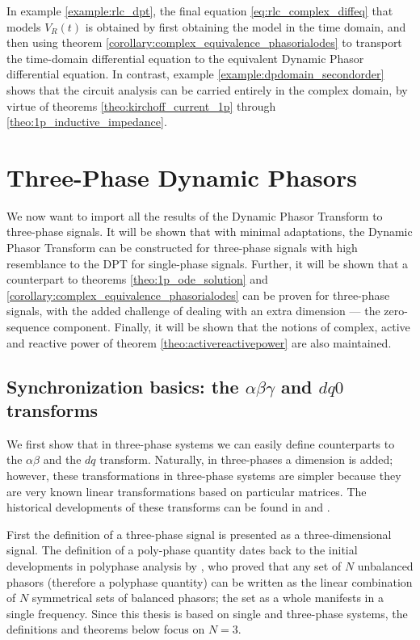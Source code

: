 	In example \ref{example:rlc_dpt}, the final equation \eqref{eq:rlc_complex_diffeq} that models $V_R(t)$ is obtained by first obtaining the model in the time domain, and then using theorem \ref{corollary:complex_equivalence_phasorialodes} to transport the time-domain differential equation to the equivalent Dynamic Phasor differential equation. In contrast, example \ref{example:dpdomain_secondorder} shows that the circuit analysis can be carried entirely in the complex domain, by virtue of theorems \ref{theo:kirchoff_current_1p} through \ref{theo:1p_inductive_impedance}.

\section{Three-Phase Dynamic Phasors} %

	We now want to import all the results of the Dynamic Phasor Transform to three-phase signals. It will be shown that with minimal adaptations, the Dynamic Phasor Transform can be constructed for three-phase signals with high resemblance to the DPT for single-phase signals. Further, it will be shown that a counterpart to theorems \ref{theo:1p_ode_solution} and \ref{corollary:complex_equivalence_phasorialodes} can be proven for three-phase signals, with the added challenge of dealing with an extra dimension — the zero-sequence component. Finally, it will be shown that the notions of complex, active and reactive power of theorem \ref{theo:activereactivepower} are also maintained.

\subsection{Synchronization basics: the $\alpha\beta\gamma$ and $dq0$ transforms} %

	We first show that in three-phase systems we can easily define counterparts to the $\alpha\beta$ and the $dq$ transform. Naturally, in three-phases a dimension is added; however, these transformations in three-phase systems are simpler because they are very known linear transformations based on particular matrices. The historical developments of these transforms can be found in  \cite{orourkeGeometricInterpretationReference2019,Park1929,Krause1965} and \cite{clarke1938problems}.

	First the definition of a three-phase signal is presented as a three-dimensional signal. The definition of a poly-phase quantity dates back to the initial developments in polyphase analysis by \cite{Fortescue1918}, who proved that any set of $N$ unbalanced phasors (therefore a polyphase quantity) can be written as the linear combination of $N$ symmetrical sets of balanced phasors; the set as a whole manifests in a single frequency. Since this thesis is based on single and three-phase systems, the definitions and theorems below focus on $N=3$.


